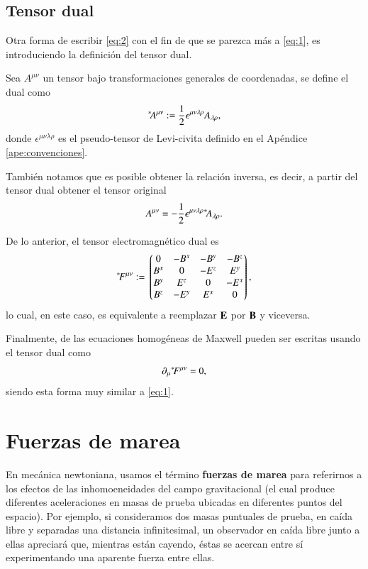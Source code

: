 \subsection{Tensor dual}

Otra forma de escribir \eqref{eq:2} con el fin de que se parezca más a \eqref{eq:1}, es introduciendo la definición del tensor dual. 

Sea $A^{\mu \nu}$ un tensor bajo transformaciones generales de coordenadas, se define el dual como
\begin{equation}
{}^*\! A^{\mu \nu} := \frac{1}{2} \epsilon^{\mu \nu \lambda \rho} A_{\lambda \rho},
\end{equation}
donde $\epsilon^{\mu \nu \lambda \rho}$ es el pseudo-tensor de Levi-civita definido en el Apéndice \ref{ape:convenciones}.

También notamos que es posible obtener la relación inversa, es decir, a partir del tensor dual obtener el tensor original
\begin{equation}
A^{\mu \nu} = -\frac{1}{2} \epsilon^{\mu \nu \lambda \rho} {}^*\! A_{\lambda \rho}.
\end{equation}

De lo anterior, el tensor electromagnético dual es
\begin{equation}
\label{eq:3}
\dual{F}^{\mu \nu} := \mqty*(
0 & -B^x & -B^y & -B^z \\
B^x & 0 & -E^z & E^y \\
B^y & E^z & 0 & -E^x \\
B^z & -E^y & E^x & 0 \\ 
),
\end{equation}
lo cual, en este caso, es equivalente a reemplazar $\vb{E}$ por $\vb{B}$ y viceversa.

Finalmente, de las ecuaciones homogéneas de Maxwell pueden ser escritas usando el tensor dual como
\begin{equation}
\partial_{\mu} {}^*\! F^{\mu \nu} = 0,
\end{equation}
siendo esta forma muy similar a \eqref{eq:1}.

\section{Fuerzas de marea}
\label{sec:1}

En mecánica newtoniana, usamos el término \textbf{fuerzas de marea} para referirnos a los efectos de las inhomoeneidades del campo gravitacional (el cual produce diferentes aceleraciones en masas de prueba ubicadas en diferentes puntos del espacio). Por ejemplo, si consideramos dos masas puntuales de prueba, en caída libre y separadas una distancia infinitesimal, un observador en caída libre junto a ellas apreciará que, mientras están cayendo, éstas se acercan entre sí experimentando una aparente fuerza entre ellas.

